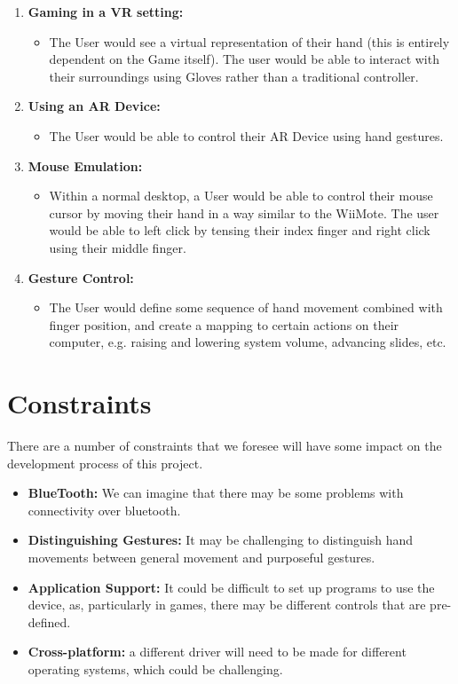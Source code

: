 \documentclass[12pt,a4paper,oneside]{book}
\theoremstyle{plain}
\numberwithin{equation}{chapter}
\begin{document}
\begin{enumerate}
\item \textbf{Gaming in a VR setting:}
\begin{itemize}
    \item The User would see a virtual representation of their hand (this is entirely dependent on the Game itself). The user would be able to interact with their surroundings using Gloves rather than a traditional controller.
\end{itemize}

\item \textbf{Using an AR Device:}
\begin{itemize}
    \item The User would be able to control their AR Device using hand gestures.
\end{itemize}


\item \textbf{Mouse Emulation:}
\begin{itemize}
    \item Within a normal desktop, a User would be able to control their mouse cursor by moving their hand in a way similar to the WiiMote. The user would be able to left click by tensing their index finger and right click using their middle finger.
\end{itemize}


\item \textbf{Gesture Control:}
\begin{itemize}
    \item The User would define some sequence of hand movement combined with finger position, and create a mapping to certain actions on their computer, e.g. raising and lowering system volume, advancing slides, etc.
\end{itemize}

\end{enumerate}

\section{Constraints}

\noindent There are a number of constraints that we foresee will have some impact on the development process of this project.

\begin{itemize}
    \item \textbf{BlueTooth:} We can imagine that there may be some problems with connectivity over bluetooth.
    \item \textbf{Distinguishing Gestures:} It may be challenging to distinguish hand movements between general movement and purposeful gestures.
    \item \textbf{Application Support:} It could be difficult to set up programs to use the device, as, particularly in games, there may be different controls that are pre-defined.
    \item \textbf{Cross-platform:} a different driver will need to be made for different operating systems, which could be challenging.
\end{itemize}
\end{document}
